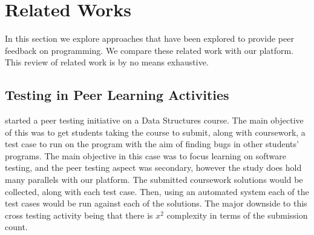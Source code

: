 \documentclass[sigplan,10pt,review]{acmart}\settopmatter{printfolios=true}
\begin{document}


\section{Related Works}
\label{sec:related-works}

In this section we explore approaches that have been explored to
provide peer feedback on programming. We compare these related work
with our platform. This review of related work is by no means
exhaustive.


\subsection{Testing in Peer Learning Activities}


\citet{goldwasser_gimmick_2002} started a peer testing initiative on a
Data Structures course.  The main objective of this was to get
students taking the course to submit, along with coursework, a test
case to run on the program with the aim of finding bugs in other
students' programs. The main objective in this case was to focus
learning on software testing, and the peer testing aspect was
secondary, however the study does hold many parallels with our
platform.
%
The submitted coursework solutions would be collected, along with each
test case. Then, using an automated system each of the test cases
would be run against each of the solutions. The major downside to this
cross testing activity being that there is $x^2$ complexity in terms
of the submission count.
\end{document}
